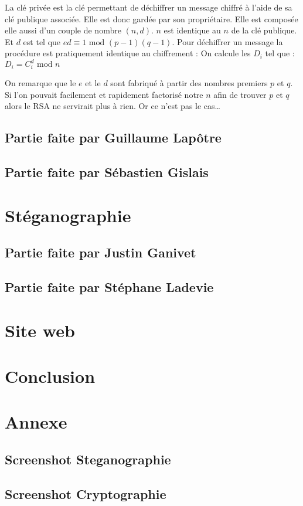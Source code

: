 \documentclass[a4paper,12pt]{article}
\begin{document}
		La clé privée est la clé permettant de déchiffrer un message chiffré à l'aide de sa clé publique associée. Elle est donc gardée par son propriétaire. Elle est composée elle aussi d'un couple de nombre $(n,d)$. $n$ est identique au $n$ de la clé publique. Et $d$ est tel que $ed \equiv 1 \textrm{ mod } (p - 1)(q - 1)$. Pour déchiffrer un message la procédure est pratiquement identique au chiffrement : On calcule les $D_{i}$ tel que : $D_{i} = C_{i}^d \textrm{ mod } n$
		
		On remarque que le $e$ et le $d$ sont fabriqué à partir des nombres premiers $p$ et $q$. Si l'on pouvait facilement et rapidement factorisé notre $n$ afin de trouver $p$ et $q$ alors le RSA ne servirait plus à rien. Or ce n'est pas le cas\dots 
		\subsection{Partie faite par Guillaume Lap\^{o}tre}
		\subsection{Partie faite par Sébastien Gislais}
	\section{Stéganographie}
		\subsection{Partie faite par Justin Ganivet}
		\subsection{Partie faite par Stéphane Ladevie}
	\section{Site web}
	\section{Conclusion}
	\section*{Annexe}
		\subsection {Screenshot Steganographie}
		\subsection {Screenshot Cryptographie}
\end{document}

